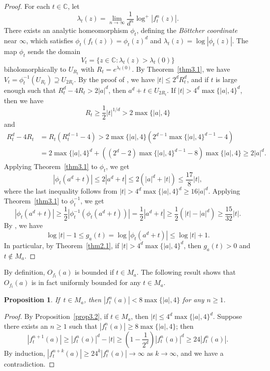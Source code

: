 \documentclass[10pt,a4paper]{amsart}
\numberwithin{equation}{section}
\theoremstyle{plain}
\newtheorem{prop}[thm]{Proposition}
\theoremstyle{definition}
\theoremstyle{remark}
\newcommand{\C}{\mathbb C}
\begin{document}
\begin{proof}
For each $t\in\C$, let
\[
\lambda_{t}(z)=\lim_{n\to\infty}\frac{1}{d^{n}}\log^{+}|f_{t}^{n}(z)|.
\]
There exists an analytic homeomorphism $\phi_{t}$, defining the \textit{B\"ottcher coordinate} near $\infty$, which satisfies $\phi_{t}(f_{t}(z))=\phi_{t}(z)^{d}$ and $\lambda_{t}(z)=\log|\phi_{t}(z)|$. The map $\phi_{t}$ sends the domain
\[
V_{t}=\{z\in\C:\lambda_{t}(z)>\lambda_{t}(0)\}
\]
biholomorphically to $U_{R_{t}}$ with $R_{t}=e^{\lambda_{t}(0)}$.
By Theorem~\ref{thm3.1}, we have $V_{t}=\phi_{t}^{-1}(U_{R_{t}})\supseteq U_{2R_{t}}$.
By the proof of \cite[Lemma 3.2]{BD1}, we have $|t|\leq2^{d}R_{t}^{d}$,
and if $t$ is large enough such that $R_{t}^{d}-4R_{t}>2|a|^{d}$,
then $a^{d}+t\in U_{2R_{t}}$. If $|t|>4^{d}\max\{|a|,4\}^{d}$, then
we have
\[
R_{t}\geq\frac{1}{2}|t|^{1/d}>2\max\{|a|,4\}
\]
and
\begin{align*}
R_{t}^{d}-4R_{t} & =R_{t}\left(R_{t}^{d-1}-4\right)>2\max\{|a|,4\}\left(2^{d-1}\max\{|a|,4\}^{d-1}-4\right)\\
 & =2\max\{|a|,4\}^{d}+\left(\left(2^{d}-2\right)\max\{|a|,4\}^{d-1}-8\right)\max\{|a|,4\}\geq2|a|^{d}.
\end{align*}
Applying Theorem~\ref{thm3.1} to $\phi_{t}$, we get
\[
\left|\phi_{t}\left(a^{d}+t\right)\right|\leq2\left|a^{d}+t\right|\leq2\left(|a|^{d}+|t|\right)\leq\frac{17}{8}|t|,
\]
where the last inequality follows from $|t|>4^{d}\max\{|a|,4\}^{d}\geq16|a|^{d}$.
Applying Theorem~\ref{thm3.1} to $\phi_{t}^{-1}$, we get
\[
\left|\phi_{t}\left(a^{d}+t\right)\right|\geq\frac{1}{2}\left|\phi_{t}^{-1}\left(\phi_{t}\left(a^{d}+t\right)\right)\right|=\frac{1}{2}\left|a^{d}+t\right|\geq\frac{1}{2}\left(|t|-|a|^{d}\right)\geq\frac{15}{32}|t|.
\]
By \cite[Proposition 3.3]{BD1}, we have
\[
\log|t|-1\leq g_{a}(t)=\log\left|\phi_{t}\left(a^{d}+t\right)\right|\leq\log|t|+1.
\]
In particular, by Theorem~\ref{thm2.1}, if $|t|>4^{d}\max\{|a|,4\}^{d}$,
then $g_{a}(t)>0$ and $t\notin M_{a}$.
\end{proof}

By definition, $O_{f_{t}}(a)$ is bounded if $t\in M_{a}$. The following
result shows that $O_{f_{t}}(a)$ is in fact uniformly bounded for
any $t\in M_{a}$.

\begin{prop}\label{prop3.3}
If\, $t\in M_{a}$, then $|f_{t}^{n}(a)|<8\max\{|a|,4\}$
for any $n\geq1$.
\end{prop}

\begin{proof}
By Proposition~\ref{prop3.2}, if $t\in M_{a}$, then $|t|\leq4^{d}\max\{|a|,4\}^{d}$.
Suppose there exists an $n\geq1$ such that $|f_{t}^{n}(a)|\geq8\max\{|a|,4\}$;
then
\[
\left|f_{t}^{n+1}(a)\right|\geq\left|f_{t}^{n}(a)\right|^{d}-|t|\geq\left(1-\frac{1}{2^{d}}\right)\left|f_{t}^{n}(a)\right|^{d}\geq24\left|f_{t}^{n}(a)\right|.
\]
By induction, $|f_{t}^{n+k}(a)|\geq24^{k}|f_{t}^{n}(a)|\to\infty$
as $k\to\infty$, and we have a contradiction.
\end{proof}
\end{document}
